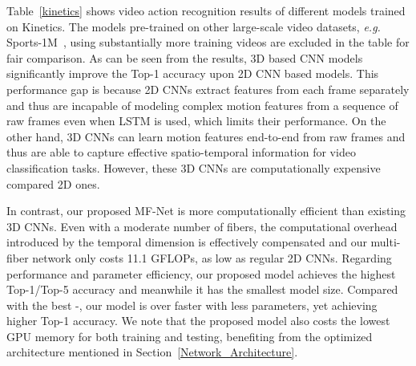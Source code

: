 \documentclass[runningheads]{llncs}
\newcommand{\ours}[0]{MF-Net\xspace}
\newcommand{\ourslong}[0]{multi-fiber\xspace}
\begin{document}
\begin{table}[t]
\caption{Comparison on action recognition accuracy with state-of-the-arts on Kinetics. The complexity is measured using FLOPs, \emph{i.e.} floating-point multiplication-adds. All results are only using RGB information, \emph{i.e.} no optical flow. Results with citation numbers are copied from the respective papers. }
\centering
{}
\label{kinetics}
\end{table}
Table~\ref{kinetics} shows video action recognition results of different models trained on Kinetics. The models pre-trained on other large-scale video datasets, \emph{e.g.} Sports-1M~\cite{KarpathyCVPR14}, using substantially more training videos are excluded in the table for fair comparison. As can be seen from the results, 3D based CNN models significantly improve the Top-1 accuracy upon 2D CNN based models. This performance gap is because 2D CNNs extract features from each frame separately and thus are incapable of modeling complex motion features from a sequence of raw frames even when LSTM is used, which limits their performance. On the other hand, 3D CNNs can learn motion features end-to-end from raw frames and thus are able to capture effective spatio-temporal information for video classification tasks. However, these 3D CNNs are computationally expensive compared 2D ones.

In contrast, our proposed \ours is more computationally efficient than existing 3D CNNs. 
Even with a moderate number of fibers, the computational overhead introduced by the temporal dimension is effectively compensated and our \ourslong network only costs 11.1 GFLOPs, as low as regular 2D CNNs.
Regarding performance and parameter efficiency, our proposed model achieves the highest Top-1/Top-5 accuracy and meanwhile it has the smallest model size. Compared with the best -, our model is over  faster with  less parameters, yet achieving  higher Top-1 accuracy. We note that the proposed model also costs the lowest GPU memory for both training and testing, benefiting from the optimized architecture mentioned in Section~\ref{Network_Architecture}.
\end{document}
